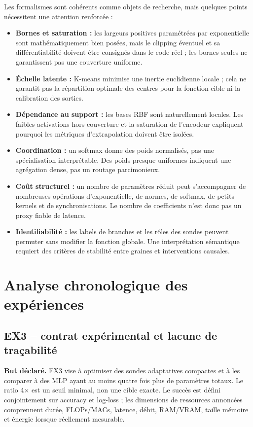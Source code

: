 \documentclass[11pt,a4paper]{article}
\begin{document}
Les formalismes sont cohérents comme objets de recherche, mais quelques points nécessitent une attention renforcée :
\begin{itemize}
  \item \textbf{Bornes et saturation :} les largeurs positives paramétrées par exponentielle sont mathématiquement bien posées, mais le clipping éventuel et sa différentiabilité doivent être consignés dans le code réel ; les bornes seules ne garantissent pas une couverture uniforme.
  \item \textbf{Échelle latente :} K-means minimise une inertie euclidienne locale ; cela ne garantit pas la répartition optimale des centres pour la fonction cible ni la calibration des sorties.
  \item \textbf{Dépendance au support :} les bases RBF sont naturellement locales. Les faibles activations hors couverture et la saturation de l'encodeur expliquent pourquoi les métriques d'extrapolation doivent être isolées.
  \item \textbf{Coordination :} un softmax donne des poids normalisés, pas une spécialisation interprétable. Des poids presque uniformes indiquent une agrégation dense, pas un routage parcimonieux.
  \item \textbf{Coût structurel :} un nombre de paramètres réduit peut s'accompagner de nombreuses opérations d'exponentielle, de normes, de softmax, de petits kernels et de synchronisations. Le nombre de coefficients n'est donc pas un proxy fiable de latence.
  \item \textbf{Identifiabilité :} les labels de branches et les rôles des sondes peuvent permuter sans modifier la fonction globale. Une interprétation sémantique requiert des critères de stabilité entre graines et interventions causales.
\end{itemize}

\section{Analyse chronologique des expériences}

\subsection{EX3 -- contrat expérimental et lacune de traçabilité}

\textbf{But déclaré.} EX3 vise à optimiser des sondes adaptatives compactes et à les comparer à des MLP ayant au moins quatre fois plus de paramètres totaux. Le ratio 4\(\times\) est un seuil minimal, non une cible exacte. Le succès est défini conjointement sur accuracy et log-loss ; les dimensions de ressources annoncées comprennent durée, FLOPs/MACs, latence, débit, RAM/VRAM, taille mémoire et énergie lorsque réellement mesurable.
\end{document}
